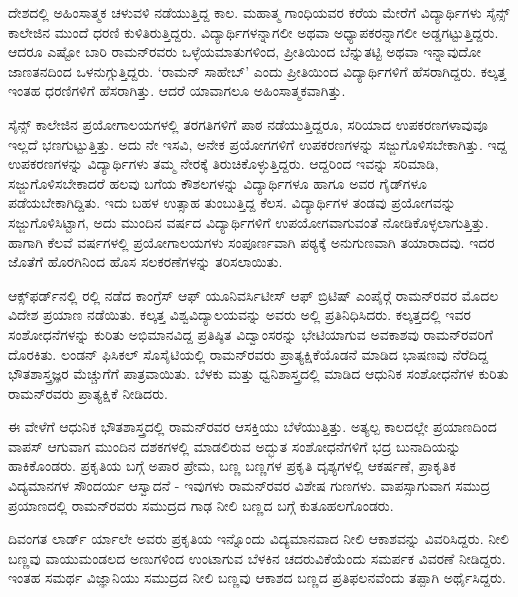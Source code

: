 ದೇಶದಲ್ಲಿ ಅಹಿಂಸಾತ್ಮಕ ಚಳುವಳಿ ನಡೆಯುತ್ತಿದ್ದ ಕಾಲ. ಮಹಾತ್ಮ ಗಾಂಧಿಯವರ ಕರೆಯ ಮೇರೆಗೆ ವಿದ್ಯಾರ್ಥಿಗಳು ಸೈನ್ಸ್ ಕಾಲೇಜಿನ ಮುಂದೆ ಧರಣಿ ಕುಳಿತಿರುತ್ತಿದ್ದರು. ವಿದ್ಯಾರ್ಥಿಗಳನ್ನಾಗಲೀ ಅಥವಾ ಅಧ್ಯಾಪಕರನ್ನಾಗಲೀ ಅಡ್ಡಗಟ್ಟುತ್ತಿದ್ದರು. ಆದರೂ ಎಷ್ಟೋ ಬಾರಿ ರಾಮನ್‍ರವರು ಒಳ್ಳೆಯಮಾತುಗಳಿಂದ, ಪ್ರೀತಿಯಿಂದ ಬೆನ್ನುತಟ್ಟಿ ಅಥವಾ ಇನ್ನಾವುದೋ ಜಾಣತನದಿಂದ ಒಳನುಗ್ಗುತ್ತಿದ್ದರು. ‘ರಾಮನ್ ಸಾಹೇಬ್’ ಎಂದು ಪ್ರೀತಿಯಿಂದ ವಿದ್ಯಾರ್ಥಿಗಳಿಗೆ ಹೆಸರಾಗಿದ್ದರು. ಕಲ್ಕತ್ತ ಇಂತಹ ಧರಣಿಗಳಿಗೆ ಹೆಸರಾಗಿತ್ತು. ಆದರೆ ಯಾವಾಗಲೂ ಅಹಿಂಸಾತ್ಮಕವಾಗಿತ್ತು. 

ಸೈನ್ಸ್ ಕಾಲೇಜಿನ ಪ್ರಯೋಗಾಲಯಗಳಲ್ಲಿ ತರಗತಿಗಳಿಗೆ ಪಾಠ ನಡೆಯುತ್ತಿದ್ದರೂ, ಸರಿಯಾದ ಉಪಕರಣಗಳಾವುವೂ ಇಲ್ಲದೆ ಭಣಗುಟ್ಟುತ್ತಿತ್ತು. ಅದು ನೇ ಇಸವಿ, ಅನೇಕ ಪ್ರಯೋಗಗಳಿಗೆ ಉಪಕರಣಗಳನ್ನು ಸಜ್ಜುಗೊಳಿಸಬೇಕಾಗಿತ್ತು. ಇದ್ದ ಉಪಕರಣಗಳನ್ನು ವಿದ್ಯಾರ್ಥಿಗಳು ತಮ್ಮ ನೇರಕ್ಕೆ ತಿರುಚಿಕೊಳ್ಳುತ್ತಿದ್ದರು. ಆದ್ದರಿಂದ ಇವನ್ನು ಸರಿಮಾಡಿ, ಸಜ್ಜುಗೊಳಿಸಬೇಕಾದರೆ ಹಲವು ಬಗೆಯ ಕೌಶಲಗಳನ್ನು ವಿದ್ಯಾರ್ಥಿಗಳೂ ಹಾಗೂ ಅವರ ಗೈಡ್‍ಗಳೂ ಪಡೆಯಬೇಕಾಗಿದ್ದಿತು. ಇದು ಬಹಳ ಉತ್ಸಾಹ ತುಂಬುತ್ತಿದ್ದ ಕೆಲಸ. ವಿದ್ಯಾರ್ಥಿಗಳ ತಂಡವು ಪ್ರಯೋಗವನ್ನು ಸಜ್ಜುಗೊಳಿಸಿಟ್ಟಾಗ, ಅದು ಮುಂದಿನ ವರ್ಷದ ವಿದ್ಯಾರ್ಥಿಗಳಿಗೆ ಉಪಯೋಗವಾಗುವಂತೆ ನೋಡಿಕೊಳ್ಳಲಾಗುತ್ತಿತ್ತು. ಹಾಗಾಗಿ ಕೆಲವೆ ವರ್ಷಗಳಲ್ಲಿ ಪ್ರಯೋಗಾಲಯಗಳು ಸಂಪೂರ್ಣವಾಗಿ  ಪಠ್ಯಕ್ಕೆ ಅನುಗುಣವಾಗಿ ತಯಾರಾದವು. ಇದರ ಜೊತೆಗೆ ಹೊರಗಿನಿಂದ ಹೊಸ ಸಲಕರಣೆಗಳನ್ನು ತರಿಸಲಾಯಿತು.



ಆಕ್ಸ್‌ಫರ್ಡ್‌ನಲ್ಲಿ ರಲ್ಲಿ ನಡೆದ ಕಾಂಗ್ರೆಸ್ ಆಫ್ ಯೂನಿವರ್ಸಿಟೀಸ್ ಆಫ್ ಬ್ರಿಟಿಷ್ ಎಂಪೈರ್‍ಗೆ ರಾಮನ್‍ರವರ ಮೊದಲ ವಿದೇಶ ಪ್ರಯಾಣ ನಡೆಯಿತು. ಕಲ್ಕತ್ತ ವಿಶ್ವವಿದ್ಯಾಲಯವನ್ನು ಅವರು ಅಲ್ಲಿ ಪ್ರತಿನಿಧಿಸಿದರು. ಕಲ್ಕತ್ತದಲ್ಲಿ ಇವರ ಸಂಶೋಧನೆಗಳನ್ನು ಕುರಿತು ಅಭಿಮಾನವಿದ್ದ ಪ್ರತಿಷ್ಠಿತ ವಿದ್ವಾಂಸರನ್ನು ಭೇಟಿಯಾಗುವ ಅವಕಾಶವು ರಾಮನ್‍ರವರಿಗೆ ದೊರಕಿತು. ಲಂಡನ್ ಫಿಸಿಕಲ್ ಸೊಸೈಟಿಯಲ್ಲಿ ರಾಮನ್‍ರವರು ಪ್ರಾತ್ಯಕ್ಷಿಕೆಯೊಡನೆ ಮಾಡಿದ ಭಾಷಣವು ನೆರೆದಿದ್ದ ಭೌತಶಾಸ್ತ್ರಜ್ಞರ ಮೆಚ್ಚುಗೆಗೆ ಪಾತ್ರವಾಯಿತು. ಬೆಳಕು ಮತ್ತು ಧ್ವನಿಶಾಸ್ತ್ರದಲ್ಲಿ ಮಾಡಿದ ಆಧುನಿಕ ಸಂಶೋಧನೆಗಳ ಕುರಿತು ರಾಮನ್‍ರವರು ಪ್ರಾತ್ಯಕ್ಷಿಕೆ ನೀಡಿದರು.

ಈ ವೇಳೆಗೆ ಆಧುನಿಕ ಭೌತಶಾಸ್ತ್ರದಲ್ಲಿ ರಾಮನ್‍ರವರ ಆಸಕ್ತಿಯು ಬೆಳೆಯುತ್ತಿತ್ತು. ಅತ್ಯಲ್ಪ ಕಾಲದಲ್ಲೇ ಪ್ರಯಾಣದಿಂದ ವಾಪಸ್ ಆಗುವಾಗ ಮುಂದಿನ ದಶಕಗಳಲ್ಲಿ ಮಾಡಲಿರುವ ಅದ್ಭುತ ಸಂಶೋಧನೆಗಳಿಗೆ ಭದ್ರ ಬುನಾದಿಯನ್ನು ಹಾಕಿಕೊಂಡರು. ಪ್ರಕೃತಿಯ ಬಗ್ಗೆ ಅಪಾರ ಪ್ರೇಮ, ಬಣ್ಣ ಬಣ್ಣಗಳ ಪ್ರಕೃತಿ ದೃಶ್ಯಗಳಲ್ಲಿ ಆಕರ್ಷಣೆ, ಪ್ರಾಕೃತಿಕ ವಿದ್ಯಮಾನಗಳ ಸೌಂದರ್ಯ ಆಸ್ವಾದನೆ - ಇವುಗಳು ರಾಮನ್‍ರವರ ವಿಶೇಷ ಗುಣಗಳು. ವಾಪಸ್ಸಾಗುವಾಗ ಸಮುದ್ರ ಪ್ರಯಾಣದಲ್ಲಿ ರಾಮನ್‍ರವರು ಸಮುದ್ರದ ಗಾಢ ನೀಲಿ ಬಣ್ಣದ ಬಗ್ಗೆ ಕುತೂಹಲಗೊಂಡರು.

ದಿವಂಗತ ಲಾರ್ಡ್ ರ್ಯಾಲೇ ಅವರು ಪ್ರಕೃತಿಯ ಇನ್ನೊಂದು ವಿದ್ಯಮಾನವಾದ ನೀಲಿ ಆಕಾಶವನ್ನು ವಿವರಿಸಿದ್ದರು. ನೀಲಿ ಬಣ್ಣವು ವಾಯುಮಂಡಲದ ಅಣುಗಳಿಂದ ಉಂಟಾಗುವ ಬೆಳಕಿನ ಚದರುವಿಕೆಯೆಂದು ಸಮರ್ಪಕ ವಿವರಣೆ ನೀಡಿದ್ದರು. ಇಂತಹ ಸಮರ್ಥ ವಿಜ್ಞಾನಿಯು ಸಮುದ್ರದ ನೀಲಿ ಬಣ್ಣವು ಆಕಾಶದ ಬಣ್ಣದ ಪ್ರತಿಫಲನವೆಂದು ತಪ್ಪಾಗಿ ಅರ್ಥೈಸಿದ್ದರು.

